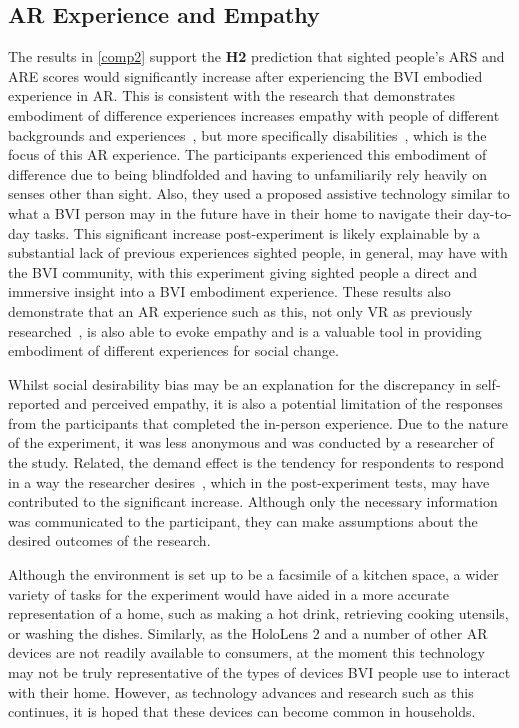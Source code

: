 \documentclass{vgtc}                          %
\begin{document}
\subsection{AR Experience and Empathy}
The results in \ref{comp2} support the \textbf{H2} prediction that sighted people's ARS and ARE scores would significantly increase after experiencing the BVI embodied experience in AR. This is consistent with the research that demonstrates embodiment of difference experiences increases empathy with people of different backgrounds and experiences~\cite{yee2011men,groom2009influence,yee2007proteus}, but more specifically disabilities~\cite{bacchus2019life, calepso2020, Guarese:Xchange, guareseEmpathy:2021}, which is the focus of this AR experience. The participants experienced this embodiment of difference due to being blindfolded and having to unfamiliarily rely heavily on senses other than sight. Also, they used a proposed assistive technology similar to what a BVI person may in the future have in their home to navigate their day-to-day tasks. This significant increase post-experiment is likely explainable by a substantial lack of previous experiences sighted people, in general, may have with the BVI community, with this experiment giving sighted people a direct and immersive insight into a BVI embodiment experience.
These results also demonstrate that an AR experience such as this, not only VR as previously researched~\cite{empathyLitReview,kandaurova2019effects,bujic2020empathy}, is also able to evoke empathy and is a valuable tool in providing embodiment of different experiences for social change.



Whilst social desirability bias may be an explanation for the discrepancy in self-reported and perceived empathy, it is also a potential limitation of the responses from the participants that completed the in-person experience. Due to the nature of the experiment, it was less anonymous and was conducted by a researcher of the study. Related, the demand effect is the tendency for respondents to respond in a way the researcher desires~\cite{zizzo2010experimenter}, which in the post-experiment tests, may have contributed to the significant increase. Although only the necessary information was communicated to the participant, they can make assumptions about the desired outcomes of the research.

Although the environment is set up to be a facsimile of a kitchen space, a wider variety of tasks for the experiment would have aided in a more accurate representation of a home, such as making a hot drink, retrieving cooking utensils, or washing the dishes. Similarly, as the HoloLens 2 and a number of other AR devices are not readily available to consumers, at the moment this technology may not be truly representative of the types of devices BVI people use to interact with their home. However, as technology advances and research such as this continues, it is hoped that these devices can become common in households. 
\end{document}
